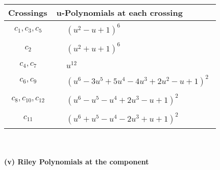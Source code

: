 \documentclass[1p]{elsarticle_modified}
\theoremstyle{definition}
\begin{document}
\begin{tabular}{m{50pt}|m{274pt}}
Crossings & \hspace{64pt}u-Polynomials at each crossing \\
\hline $$\begin{aligned}c_{1},c_{3},c_{5}\end{aligned}$$&$\begin{aligned}
&(u^2- u+1)^6
\end{aligned}$\\
\hline $$\begin{aligned}c_{2}\end{aligned}$$&$\begin{aligned}
&(u^2+u+1)^6
\end{aligned}$\\
\hline $$\begin{aligned}c_{4},c_{7}\end{aligned}$$&$\begin{aligned}
&u^{12}
\end{aligned}$\\
\hline $$\begin{aligned}c_{6},c_{9}\end{aligned}$$&$\begin{aligned}
&(u^6-3 u^5+5 u^4-4 u^3+2 u^2- u+1)^2
\end{aligned}$\\
\hline $$\begin{aligned}c_{8},c_{10},c_{12}\end{aligned}$$&$\begin{aligned}
&(u^6- u^5- u^4+2 u^3- u+1)^2
\end{aligned}$\\
\hline $$\begin{aligned}c_{11}\end{aligned}$$&$\begin{aligned}
&(u^6+u^5- u^4-2 u^3+u+1)^2
\end{aligned}$\\
\hline
\end{tabular}\\~\\
\newpage\renewcommand{\arraystretch}{1}
\flushleft \textbf{(v) Riley Polynomials at the component}\newline \\
\end{document}
